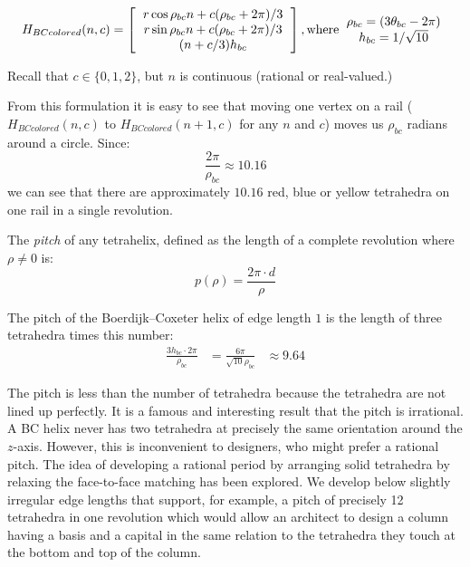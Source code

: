 \documentclass[review]{siamonline1116}
\begin{document}
\begin{equation}
H_{BCcolored}(n,c) =
\left [
  \begin{tabular}{c}
    $ r  \cos{\rho_{bc} n + c (\rho_{bc} +  2 \pi) /3} $\\
   $ r  \sin{\rho_{bc} n + c (\rho_{bc} +  2 \pi) /3} $\\
   $ (n+c/3)  h_{bc} $
  \end{tabular}
  \right ],
\text{where}
  \begin{tabular}{c}
    $\rho_{bc} = (3 \theta_{bc} - 2 \pi)$ \\
    $ h_{bc} = 1/\sqrt{10} $ \\    
  \end{tabular}      
\end{equation}

Recall that $c \in \{0,1,2\}$, but $n$ is continuous (rational or real-valued.)

From this formulation it is easy to see that moving one vertex on a rail
($H_{BCcolored}(n,c)$ to $H_{BCcolored}(n+1,c)$ for any $n$ and $c$)
moves us $\rho_{bc}$ radians around a circle. Since:
\[ \frac{2 \pi}{\rho_{bc}} \approx 10.16
\]
we can see that there are approximately $10.16$ red, blue or yellow tetrahedra on one rail in a single revolution.

The \emph{pitch} of any tetrahelix, defined as the length of a complete revolution
where $\rho \neq 0$ is:
\begin{equation}
  \label{pitcheqn}
p(\rho) = \frac{2 \pi  \cdot d}{\rho}
\end{equation}

The pitch of the Boerdijk--Coxeter helix of edge length $1$ is the length of three tetrahedra times this number:
\begin{align*}
   \frac{3 h_{bc}\cdot  2 \pi }{\rho_{bc}} 
  &= \frac{6 \pi}{\sqrt{10}\rho_{bc}} 
  &\approx 9.64 
\end{align*}


The pitch is less than the number of tetrahedra because the tetrahedra
are not lined up perfectly.  It is a famous and interesting result
that the pitch is irrational. A BC helix never has two tetrahedra at
precisely the same orientation around the $z$-axis. However, this is
inconvenient to designers, who might prefer a rational pitch.
The idea of developing a rational period by arranging solid tetrahedra by relaxing the face-to-face matching
has been explored\cite{sadler2013periodic}. 
We develop below slightly irregular edge lengths that support, for example, a pitch of precisely 12
tetrahedra in one revolution which would allow an architect to design a
column having a basis and a capital in the same relation to the
tetrahedra they touch at the bottom and top of the column.
\end{document}
